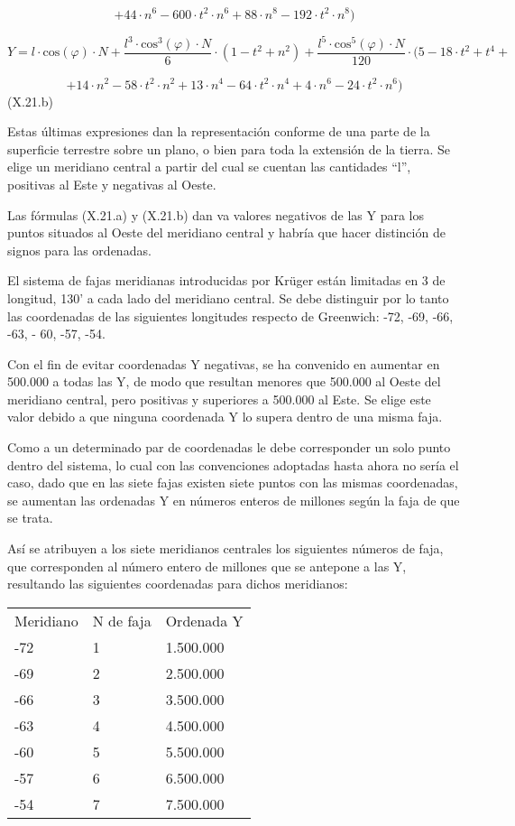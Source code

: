 \documentclass[]{article}
\begin{document}
\[+\text{44}\cdot n^6-\text{600}\cdot t^2\cdot n^6+\text{88}\cdot n^8-\text{192}\cdot t^2\cdot n^8)\]

\[Y=l\cdot \text{cos}\left(\varphi \right)\cdot N+\frac{l^3\cdot \text{cos}^3\left(\varphi \right)\cdot N}{6}\cdot \left(1-t^2+n^2\right)+\frac{l^5\cdot \text{cos}^5\left(\varphi \right)\cdot N}{\text{120}}\cdot (5-\text{18}\cdot t^2+t^4+\]

\[+\text{14}\cdot n^2-\text{58}\cdot t^2\cdot n^2+\text{13}\cdot n^4-\text{64}\cdot t^2\cdot n^4+4\cdot n^6-\text{24}\cdot t^2\cdot n^6)\]
(X.21.b)

Estas últimas expresiones dan la representación conforme de una parte de
la superficie terrestre sobre un plano, o bien para toda la extensión de
la tierra. Se elige un meridiano central a partir del cual se cuentan
las cantidades ``l'', positivas al Este y negativas al Oeste.

Las fórmulas (X.21.a) y (X.21.b) dan va valores negativos de las Y para
los puntos situados al Oeste del meridiano central y habría que hacer
distinción de signos para las ordenadas.

El sistema de fajas meridianas introducidas por Krüger están limitadas
en 3 de longitud, 130' a cada lado del meridiano central. Se debe
distinguir por lo tanto las coordenadas de las siguientes longitudes
respecto de Greenwich: -72, -69, -66, -63, - 60, -57, -54.

Con el fin de evitar coordenadas Y negativas, se ha convenido en
aumentar en 500.000 a todas las Y, de modo que resultan menores que
500.000 al Oeste del meridiano central, pero positivas y superiores a
500.000 al Este. Se elige este valor debido a que ninguna coordenada Y
lo supera dentro de una misma faja.

Como a un determinado par de coordenadas le debe corresponder un solo
punto dentro del sistema, lo cual con las convenciones adoptadas hasta
ahora no sería el caso, dado que en las siete fajas existen siete puntos
con las mismas coordenadas, se aumentan las ordenadas Y en números
enteros de millones según la faja de que se trata.

Así se atribuyen a los siete meridianos centrales los siguientes números
de faja, que corresponden al número entero de millones que se antepone a
las Y, resultando las siguientes coordenadas para dichos meridianos:

\begin{longtable}[]{@{}lll@{}}
\toprule
\endhead
Meridiano & N de faja & Ordenada Y\tabularnewline
-72 & 1 & 1.500.000\tabularnewline
-69 & 2 & 2.500.000\tabularnewline
-66 & 3 & 3.500.000\tabularnewline
-63 & 4 & 4.500.000\tabularnewline
-60 & 5 & 5.500.000\tabularnewline
-57 & 6 & 6.500.000\tabularnewline
-54 & 7 & 7.500.000\tabularnewline
\bottomrule
\end{longtable}
\end{document}
